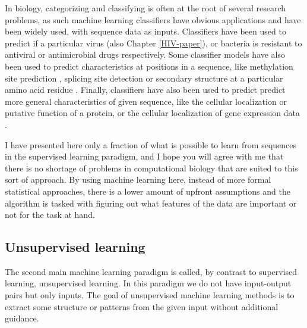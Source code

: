 \documentclass[
  11pt,
  twoside,
  BCOR=10mm,
  listof=totoc]{scrbook}
\begin{document}
In biology, categorizing and classifying is often at the root of several research problems, as such machine learning classifiers have obvious applications and have been widely used, with sequence data as inputs. Classifiers have been used to predict if a particular virus \autocite{hagaMachineLearningbasedTreatment2020,zazziPredictingResponseAntiretroviral2012} (also Chapter \ref{HIV-paper}), or bacteria \autocite{renPredictionAntimicrobialResistance2022,kimMachineLearningAntimicrobial2022} is resistant to antiviral or antimicrobial drugs respectively. Some classifier models have also been used to predict characteristics at positions in a sequence, like methylation site prediction \autocite{wangPredictingDNAMethylation2016}, splicing site detection \autocite{ratschLearningInterpretableSVMs2006} or secondary structure at a particular amino acid residue \autocite{jonesProteinSecondaryStructure1999}. Finally, classifiers have also been used to predict predict more general characteristics of given sequence, like the cellular localization \autocite{weiPredictionHumanProtein2018} or putative function \autocite{wangProteinSequenceProtein2017} of a protein, or the cellular localization of gene expression data \autocite{kelleyBassetLearningRegulatory2016}.

I have presented here only a fraction of what is possible to learn from sequences in the supervised learning paradigm, and I hope you will agree with me that there is no shortage of problems in computational biology that are suited to this sort of approach. By using machine learning here, instead of more formal statistical approaches, there is a lower amount of upfront assumptions and the algorithm is tasked with figuring out what features of the data are important or not for the task at hand.

\hypertarget{unsupervised-learning}{%
\subsection{Unsupervised learning}\label{unsupervised-learning}}

The second main machine learning paradigm is called, by contrast to supervised learning, unsupervised learning. In this paradigm we do not have input-output pairs but only inputs. The goal of unsupervised machine learning methods is to extract some structure or patterns from the given input without additional guidance.
\end{document}
